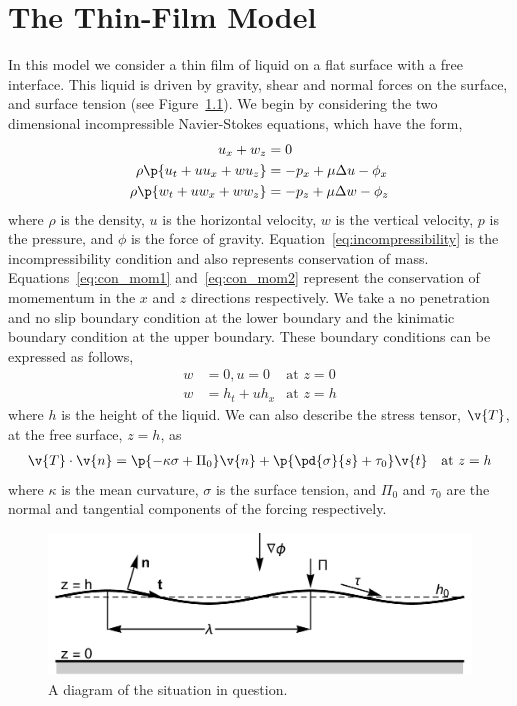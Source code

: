 \chapter{The Thin-Film Model}
  In this model we consider a thin film of liquid on a flat surface with a free interface.
  This liquid is driven by gravity, shear and normal forces on the surface, and surface
  tension (see Figure~\ref{fig:thin_film}).
  We begin by considering the two dimensional incompressible Navier-Stokes equations,
  which have the form,
  \begin{align}
    u_x + w_z &= 0 \label{eq:incompressibility}\\
    \rho\p{u_t + u u_x + w u_z} &= -p_x + \mu \Delta u - \phi_x \label{eq:con_mom1}\\
    \rho\p{w_t + u w_x + w w_z} &= -p_z + \mu \Delta w - \phi_z \label{eq:con_mom2}
  \end{align}
  where \(\rho \) is the density, \(u\) is the horizontal velocity, \(w\) is the
  vertical velocity, \(p\) is the pressure, and \(\phi \) is the force of gravity.
  Equation~\eqref{eq:incompressibility} is the incompressibility condition and also
  represents conservation of mass.
  Equations~\eqref{eq:con_mom1} and~\eqref{eq:con_mom2} represent the conservation of
  momementum in the \(x\) and \(z\) directions respectively.
  We take a no penetration and no slip boundary condition at the lower boundary and the
  kinimatic boundary condition at the upper boundary.
  These boundary conditions can be expressed as follows,
  \begin{align}
    w &= 0, u = 0 &\text{at } z = 0 \\
    w &= h_t + u h_x &\text{at } z = h
  \end{align}
  where \(h\) is the height of the liquid.
  We can also describe the stress tensor, \(\v{T}\), at the free surface, \(z = h\),
  as
  \begin{align*}
    \v{T} \cdot \v{n} &= \p{-\kappa \sigma + \Pi_0}\v{n}
      + \p{\pd{\sigma}{s} + \tau_0}\v{t} &\text{at } z = h
  \end{align*}
  where \(\kappa \) is the mean curvature, \(\sigma \) is the surface tension, and
  \(\Pi_0 \) and \(\tau_0 \) are the normal and tangential components of the forcing
  respectively.

  \begin{figure}[h]
    \centering
    \includegraphics[scale=0.45]{figures/ThinFilm.pdf}
    \caption{A diagram of the situation in question.}\label{fig:thin_film}
  \end{figure}

